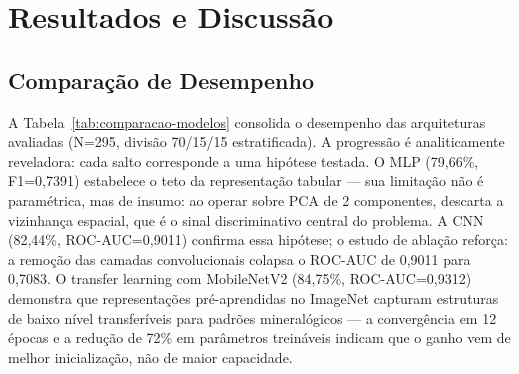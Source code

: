 \documentclass[12pt,twocolumn]{article}
\begin{document}
\section{Resultados e Discussão}\label{resultados-e-discussuxe3o}

\subsection{Comparação de Desempenho}\label{comparauxe7uxe3o-de-desempenho}

A Tabela~\ref{tab:comparacao-modelos} consolida o desempenho das arquiteturas avaliadas (N=295, divisão 70/15/15 estratificada). A progressão é analiticamente reveladora: cada salto corresponde a uma hipótese testada. O MLP (79,66\%, F1=0,7391) estabelece o teto da representação tabular --- sua limitação não é paramétrica, mas de insumo: ao operar sobre PCA de 2 componentes, descarta a vizinhança espacial, que é o sinal discriminativo central do problema. A CNN (82,44\%, ROC-AUC=0,9011) confirma essa hipótese; o estudo de ablação reforça: a remoção das camadas convolucionais colapsa o ROC-AUC de 0,9011 para 0,7083. O transfer learning com MobileNetV2 (84,75\%, ROC-AUC=0,9312) demonstra que representações pré-aprendidas no ImageNet capturam estruturas de baixo nível transferíveis para padrões mineralógicos --- a convergência em 12 épocas e a redução de 72\% em parâmetros treináveis indicam que o ganho vem de melhor inicialização, não de maior capacidade.

\vspace{-4pt}
\begin{table}[H]
\centering
\caption{Comparação consolidada entre arquiteturas no conjunto de teste. Fonte: Autores (2026)}
\label{tab:comparacao-modelos}
\end{table}
\vspace{-4pt}
\end{document}
